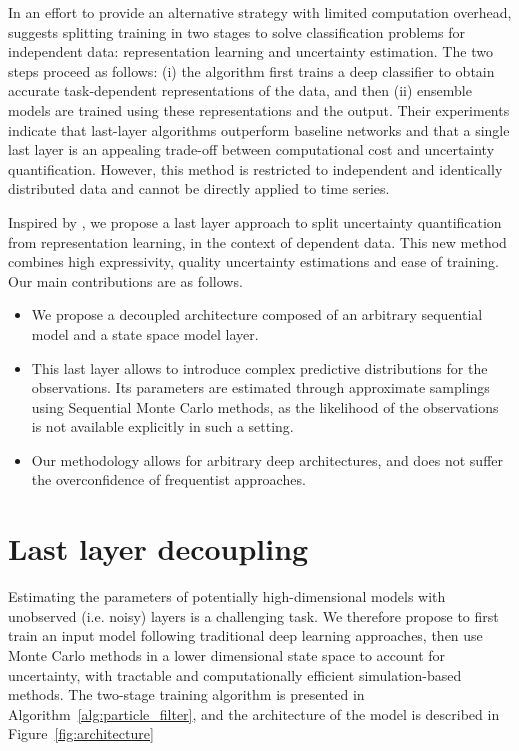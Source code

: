 \documentclass[conference]{IEEEtran}
\begin{document}
In an effort to provide an alternative strategy with limited computation overhead, \cite{Brosse2020OnLA} suggests splitting training in two stages to solve classification problems for independent data: representation learning and uncertainty estimation. The two steps proceed as follows: (i) the algorithm first trains a deep classifier to obtain accurate task-dependent representations of the data, and then (ii) ensemble models are trained using these representations and the output. Their experiments indicate that last-layer algorithms outperform baseline networks and that a single last layer is an appealing trade-off between computational cost and uncertainty quantification. However, this method is restricted to independent and identically distributed data and cannot be directly applied to time series.

Inspired by \cite{Brosse2020OnLA}, we propose a last layer approach to split uncertainty quantification from representation learning, in the context of dependent data.
This new method combines high expressivity, quality uncertainty estimations and ease of training.
Our main contributions are as follows.
\begin{itemize}
	\item We propose a decoupled architecture composed of an arbitrary sequential model and a state space model layer.
	\item This last layer allows to introduce complex predictive distributions for the observations.
	      Its parameters are estimated through approximate samplings using Sequential Monte Carlo methods, as the likelihood of the observations is not available explicitly in such a setting.
	\item Our methodology allows for arbitrary deep architectures, and does not suffer the overconfidence of frequentist approaches.
\end{itemize}

\section{Last layer decoupling}
Estimating the parameters of potentially high-dimensional models with unobserved (i.e. noisy) layers is a challenging task.
We therefore propose to first train an input model following traditional deep learning approaches, then use Monte Carlo methods in a lower dimensional state space to account for uncertainty, with tractable and computationally efficient simulation-based methods.
The two-stage training algorithm is presented in Algorithm~\ref{alg:particle_filter}, and the architecture of the model is described in Figure~\ref{fig:architecture}
\end{document}
